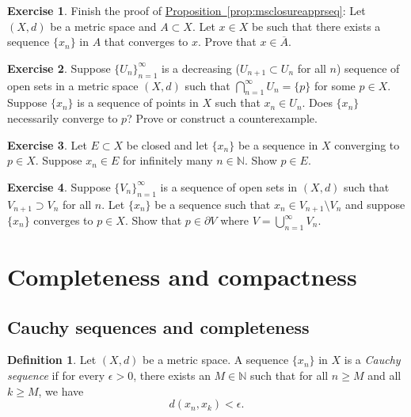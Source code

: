 \documentclass[12pt,openany]{book}
\newcommand{\widebar}[1]{\overline{#1}}
\newcommand{\N}{{\mathbb{N}}}
\newcommand{\myindex}[1]{#1\index{#1}}
\theoremstyle{plain}
\theoremstyle{remark}
\theoremstyle{definition}
\newtheorem{defn}[thm]{Definition}
\newenvironment{exbox}{%
    \def\FrameCommand{\vrule width 1pt \relax\hspace{10pt}}%
    \MakeFramed{\advance\hsize-\width\FrameRestore}%
}{%
    \endMakeFramed
}
\theoremstyle{exercise}
\newtheorem{exercise}{Exercise}[section]
\theoremstyle{example}
\newcommand{\propref}[1]{\hyperref[#1]{Proposition~\ref*{#1}}}
\begin{document}
\begin{exbox}
\begin{exercise}%
\label{exercise:reverseclosedseq}
Finish the proof of 
\propref{prop:msclosureapprseq}:
Let $(X,d)$ be a metric space and
$A \subset X$.  Let $x \in X$ be
such that there exists a sequence $\{ x_n \}$ in $A$ that converges to $x$.
Prove that $x \in \widebar{A}$.
\end{exercise}

\begin{exercise}
Suppose $\{ U_n \}_{n=1}^\infty$ is a decreasing ($U_{n+1} \subset U_n$ for
all $n$) sequence of open sets in a metric space $(X,d)$ such that
$\bigcap_{n=1}^\infty U_n = \{ p \}$ for some $p \in X$.  Suppose 
$\{ x_n \}$ is a sequence of points in $X$ such that $x_n \in U_n$.  Does
$\{ x_n \}$ necessarily converge to $p$?  Prove or construct a counterexample.
\end{exercise}

\begin{exercise}
Let $E \subset X$ be closed and
let $\{ x_n \}$ be a sequence in $X$ converging to $p \in X$.  Suppose
$x_n \in E$ for infinitely many $n \in \N$.  Show $p \in E$.
\end{exercise}

\begin{exercise}
Suppose $\{ V_n \}_{n=1}^\infty$ is a sequence of open sets
in $(X,d)$
such that $V_{n+1} \supset V_n$ for all $n$.  Let $\{ x_n \}$ be a sequence
such that $x_n \in V_{n+1} \setminus V_n$ and suppose 
$\{ x_n \}$ converges to $p \in X$.  Show that $p \in \partial V$
where $V = \bigcup_{n=1}^\infty V_n$.
\end{exercise}
\end{exbox}


\section{Completeness and compactness}
\label{sec:metcompact}

\subsection{Cauchy sequences and completeness}

\begin{defn}
Let $(X,d)$ be a metric space.
A sequence $\{ x_n \}$ in $X$ is a \emph{\myindex{Cauchy sequence}} if
for every $\epsilon > 0$, there exists an $M \in \N$ such that
for all $n \geq M$ and all $k \geq M$, we have
\begin{equation*}
d(x_n, x_k) < \epsilon .
\end{equation*}
\end{defn}
\end{document}
